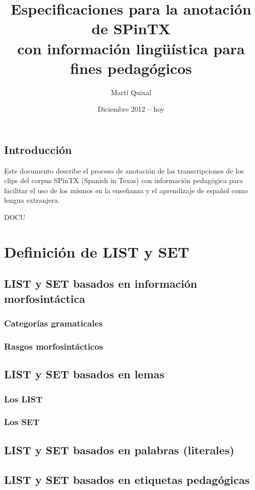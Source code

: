 \documentclass[11pt]{report}
\begin{document}
\title{Especificaciones para la anotación de SPinTX\\ con información lingüística para fines pedagógicos}
\author{Martí Quixal}
\date{Diciembre 2012 -- hoy}
\maketitle
\tableofcontents

\chapter*{Introducción}
Este documento describe el proceso de anotación de las transcripciones de los clips del corpus SPinTX (Spanish in Texas) con información pedagógica para facilitar el uso de los mismos en la enseñanza y el aprendizaje de español como lengua extranjera.

DOCU 
\part{Definición de LIST y SET}
\chapter{LIST y SET basados en información morfosintáctica}
\section{Categorías gramaticales}
\section{Rasgos morfosintácticos}
\chapter{LIST y SET basados en lemas}
\section{Los LIST}
\section{Los SET}
\chapter{LIST y SET basados en palabras (literales)}
\chapter{LIST y SET basados en etiquetas pedagógicas}
\end{document}
